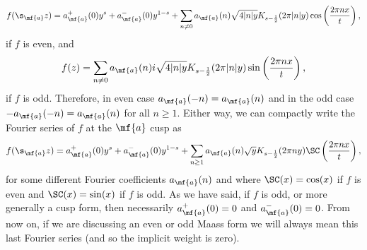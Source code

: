     \[
      f(\s_{\mf{a}}z) = a_{\mf{a}}^{+}(0)y^{s}+a_{\mf{a}}^{-}(0)y^{1-s}+\sum_{n \neq 0}a_{\mf{a}}(n)\sqrt{4|n|y}K_{s-\frac{1}{2}}(2\pi|n|y)\cos\left(\frac{2\pi nx}{t}\right),
    \]
    if $f$ is even, and
    \[
      f(z) = \sum_{n \neq 0}a_{\mf{a}}(n)i\sqrt{4|n|y}K_{s-\frac{1}{2}}(2\pi|n|y)\sin\left(\frac{2\pi nx}{t}\right),
    \]
    if $f$ is odd. Therefore, in even case $a_{\mf{a}}(-n) = a_{\mf{a}}(n)$ and in the odd case $-a_{\mf{a}}(-n) = a_{\mf{a}}(n)$ for all $n \ge 1$. Either way, we can compactly write the Fourier series of $f$ at the $\mf{a}$ cusp as
    \[
      f(\s_{\mf{a}}z) = a_{\mf{a}}^{+}(0)y^{s}+a_{\mf{a}}^{-}(0)y^{1-s}+\sum_{n \ge 1}a_{\mf{a}}(n)\sqrt{y}K_{s-\frac{1}{2}}(2\pi ny)\SC\left(\frac{2\pi nx}{t}\right),
    \]
    for some different Fourier coefficients $a_{\mf{a}}(n)$ and where $\SC(x) = \cos(x)$ if $f$ is even and $\SC(x) = \sin(x)$ if $f$ is odd. As we have said, if $f$ is odd, or more generally a cusp form, then necessarily $a_{\mf{a}}^{+}(0) = 0$ and $a_{\mf{a}}^{-}(0) = 0$. From now on, if we are discussing an even or odd Maass form we will always mean this last Fourier series (and so the implicit weight is zero).
